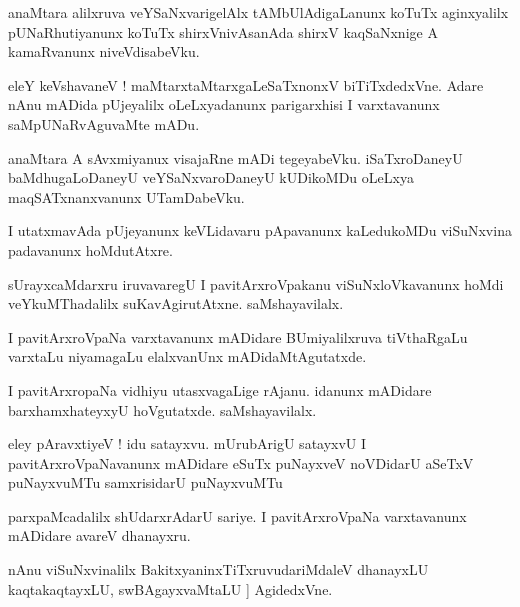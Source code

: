 \documentclass{article}
\begin{document}
\begin{mn}%
anaMtara alilxruva veYSaNxvarigelAlx tAMbUlAdigaLanunx koTuTx aginxyalilx pUNaRhutiyanunx koTuTx 
shirxVnivAsanAda shirxV kaqSaNxnige A kamaRvanunx niveVdisabeVku.
\end{mn}

\begin{mn}%
eleY keVshavaneV ! maMtarxtaMtarxgaLeSaTxnonxV biTiTxdedxVne. Adare nAnu mADida pUjeyalilx 
oLeLxyadanunx parigarxhisi I varxtavanunx saMpUNaRvAguvaMte mADu.
\end{mn}

\begin{mn}%
anaMtara A sAvxmiyanux visajaRne mADi tegeyabeVku. iSaTxroDaneyU baMdhugaLoDaneyU veYSaNxvaroDaneyU 
kUDikoMDu oLeLxya maqSATxnanxvanunx UTamDabeVku.
\end{mn}

\begin{mn}%
I utatxmavAda pUjeyanunx keVLidavaru pApavanunx kaLedukoMDu viSuNxvina padavanunx hoMdutAtxre.
\end{mn}

\begin{mn}%
sUrayxcaMdarxru iruvavaregU I pavitArxroVpakanu viSuNxloVkavanunx hoMdi veYkuMThadalilx 
suKavAgirutAtxne. saMshayavilalx.
\end{mn}

\begin{mn}%
I pavitArxroVpaNa varxtavanunx mADidare BUmiyalilxruva tiVthaRgaLu varxtaLu niyamagaLu elalxvanUnx 
mADidaMtAgutatxde.
\end{mn}

\begin{mn}%
I pavitArxropaNa vidhiyu utasxvagaLige rAjanu. idanunx mADidare barxhamxhateyxyU hoVgutatxde. 
saMshayavilalx.
\end{mn}

\begin{mn}%
eley pAravxtiyeV ! idu satayxvu. mUrubArigU satayxvU I pavitArxroVpaNavanunx mADidare eSuTx 
puNayxveV noVDidarU aSeTxV puNayxvuMTu samxrisidarU puNayxvuMTu
\end{mn}

\begin{mn}%
parxpaMcadalilx shUdarxrAdarU sariye. I pavitArxroVpaNa varxtavanunx mADidare avareV dhanayxru.
\end{mn}

\begin{mn}%
nAnu viSuNxvinalilx BakitxyaninxTiTxruvudariMdaleV dhanayxLU kaqtakaqtayxLU, swBAgayxvaMtaLU ]
AgidedxVne.
\end{mn}
\end{document}
